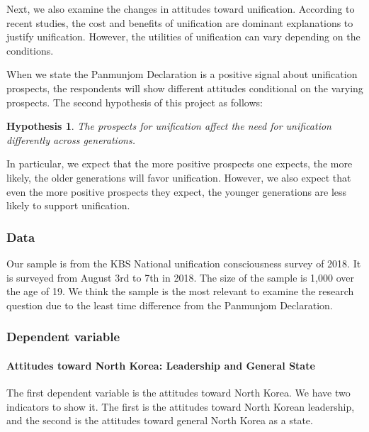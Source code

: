 \documentclass[letterpaper,10pt,twocolumn,twoside,]{pinp}
\newtheorem{hyp}{Hypothesis}
\begin{document}
Next, we also examine the changes in attitudes toward unification.
According to recent studies, the cost and benefits of unification are
dominant explanations to justify unification. However, the utilities of
unification can vary depending on the conditions.

When we state the Panmunjom Declaration is a positive signal about
unification prospects, the respondents will show different attitudes
conditional on the varying prospects. The second hypothesis of this
project as follows:

\begin{hyp}\label{hyp2} The prospects for unification affect the need for unification differently across generations. \end{hyp}

In particular, we expect that the more positive prospects one expects,
the more likely, the older generations will favor unification. However,
we also expect that even the more positive prospects they expect, the
younger generations are less likely to support unification.

\hypertarget{data}{%
\subsubsection{Data}\label{data}}

Our sample is from the KBS National unification consciousness survey of
2018. It is surveyed from August 3rd to 7th in 2018. The size of the
sample is 1,000 over the age of 19. We think the sample is the most
relevant to examine the research question due to the least time
difference from the Panmunjom Declaration.

\hypertarget{dependent-variable}{%
\subsubsection{Dependent variable}\label{dependent-variable}}

\hypertarget{attitudes-toward-north-korea-leadership-and-general-state}{%
\paragraph{Attitudes toward North Korea: Leadership and General
State}\label{attitudes-toward-north-korea-leadership-and-general-state}}

The first dependent variable is the attitudes toward North Korea. We
have two indicators to show it. The first is the attitudes toward North
Korean leadership, and the second is the attitudes toward general North
Korea as a state.
\end{document}
